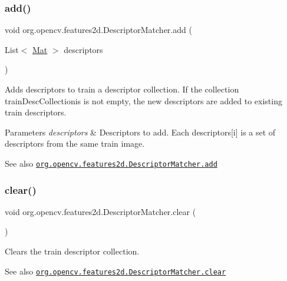\subsubsection{\texorpdfstring{add()}{add()}}
{\footnotesize\ttfamily void org.\+opencv.\+features2d.\+Descriptor\+Matcher.\+add (\begin{DoxyParamCaption}\item[{List$<$ \mbox{\hyperlink{classorg_1_1opencv_1_1core_1_1_mat}{Mat}} $>$}]{descriptors }\end{DoxyParamCaption})}

Adds descriptors to train a descriptor collection. If the collection {\ttfamily train\+Desc\+Collectionis} is not empty, the new descriptors are added to existing train descriptors.


\begin{DoxyParams}{Parameters}
{\em descriptors} & Descriptors to add. Each {\ttfamily descriptors\mbox{[}i\mbox{]}} is a set of descriptors from the same train image.\\
\hline
\end{DoxyParams}
\begin{DoxySeeAlso}{See also}
\href{http://docs.opencv.org/modules/features2d/doc/common_interfaces_of_descriptor_matchers.html#descriptormatcher-add}{\tt org.\+opencv.\+features2d.\+Descriptor\+Matcher.\+add} 
\end{DoxySeeAlso}
\mbox{\label{classorg_1_1opencv_1_1features2d_1_1_descriptor_matcher_a1e843e5c3ff04bf99a5a3d5333da2115}} 
\subsubsection{\texorpdfstring{clear()}{clear()}}
{\footnotesize\ttfamily void org.\+opencv.\+features2d.\+Descriptor\+Matcher.\+clear (\begin{DoxyParamCaption}{ }\end{DoxyParamCaption})}

Clears the train descriptor collection.

\begin{DoxySeeAlso}{See also}
\href{http://docs.opencv.org/modules/features2d/doc/common_interfaces_of_descriptor_matchers.html#descriptormatcher-clear}{\tt org.\+opencv.\+features2d.\+Descriptor\+Matcher.\+clear} 
\end{DoxySeeAlso}
\mbox{\label{classorg_1_1opencv_1_1features2d_1_1_descriptor_matcher_aa7e081a62ed26d64d4700a4609b33253}} 
